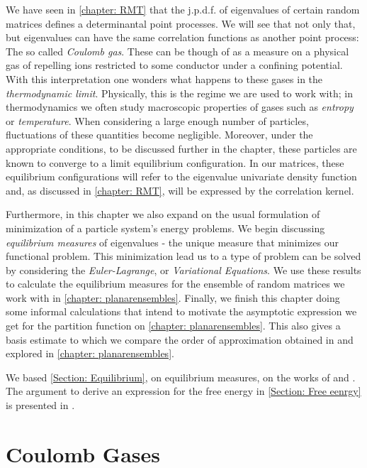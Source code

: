 We have seen in \autoref{chapter: RMT} that the j.p.d.f. of eigenvalues of certain random matrices defines a determinantal point processes. We will see that not only that, but eigenvalues can have the same correlation functions as another point process: The so called \textit{Coulomb gas}. These can be though of as a measure on a physical gas of repelling ions restricted to some conductor under a confining potential. With this interpretation one wonders what happens to these gases in the \textit{thermodynamic limit}.  Physically, this is the regime we are used to work with; in thermodynamics we often study macroscopic properties of gases such as \textit{entropy} or \textit{temperature}. When considering a large enough number of particles, fluctuations of these quantities become negligible. Moreover, under the appropriate conditions, to be discussed further in the chapter, these particles are known to converge to a limit equilibrium configuration. In our matrices, these equilibrium configurations will refer to the eigenvalue univariate density function and, as discussed in \autoref{chapter: RMT}, will be expressed by the correlation kernel.

Furthermore, in this chapter we also expand on the usual formulation of minimization of a particle system's energy problems. We begin discussing \textit{equilibrium measures} of eigenvalues - the unique measure that minimizes our functional problem. This minimization lead us to a type of problem can be solved by considering the \textit{Euler-Lagrange}, or \textit{Variational Equations}. We use these results to calculate the equilibrium measures for the ensemble of random matrices we work with in \autoref{chapter: planarensembles}. Finally, we finish this chapter doing some informal calculations that intend to motivate the asymptotic expression we get for the partition function on \autoref{chapter: planarensembles}. This also gives a basis estimate to which we compare the order of approximation obtained in  and explored in \autoref{chapter: planarensembles}. 

We based \autoref{Section: Equilibrium}, on equilibrium measures, on the works of  and . The argument to derive an expression for the free energy in \autoref{Section: Free eenrgy} is presented in .

\section{Coulomb Gases}
\label{Section: Coulomb Gas}

